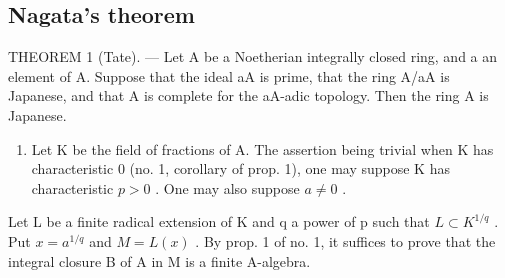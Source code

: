 \subsection{Nagata's theorem}

THEOREM 1 (Tate). --- Let A be a Noetherian integrally closed ring, and a an element of A. Suppose that the ideal aA is prime, that the ring A/aA is Japanese, and that A is complete for the aA-adic topology. Then the ring A is Japanese.

\begin{enumerate}
\def\labelenumi{\alph{enumi})}
\tightlist
\item
  Let K be the field of fractions of A. The assertion being trivial when K has characteristic 0 (no. 1, corollary of prop. 1), one may suppose K has characteristic \(p > 0\) . One may also suppose \(a \neq 0\) .
\end{enumerate}

Let L be a finite radical extension of K and q a power of p such that \(L \subset K^{1/q}\) . Put \(x = a^{1/q}\) and \(M = L(x)\) . By prop. 1 of no. 1, it suffices to prove that the integral closure B of A in M is a finite A-algebra.

